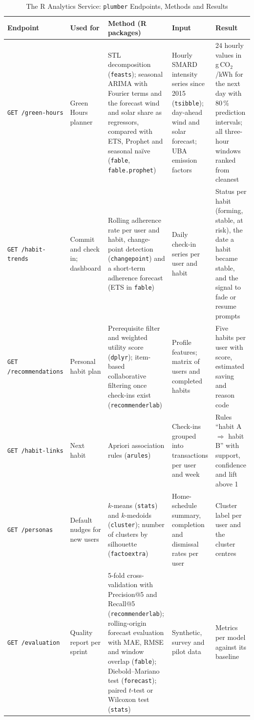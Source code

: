\documentclass[conference]{IEEEtran}
\newcommand{\COtwo}{CO$_2$}
\newcommand{\pkg}[1]{\texttt{#1}}
\begin{document}
\begin{table}[!t]
\caption{The R Analytics Service: \pkg{plumber} Endpoints, Methods and Results}
\label{tab:rapi}
\centering
\footnotesize
\begin{tabular}{@{}L{3.5cm}L{2.1cm}L{4.5cm}L{3.0cm}L{3.5cm}@{}}
\toprule
Endpoint & Used for & Method (R packages) & Input & Result \\
\midrule
\texttt{GET /green-hours} & Green Hours planner & STL decomposition (\pkg{feasts}); seasonal ARIMA with Fourier terms and the forecast wind and solar share as regressors, compared with ETS, Prophet and seasonal na\"ive (\pkg{fable}, \pkg{fable.prophet}) & Hourly SMARD intensity series since 2015 (\pkg{tsibble}); day-ahead wind and solar forecast; UBA emission factors & 24 hourly values in g\,\COtwo/kWh for the next day with 80\,\% prediction intervals; all three-hour windows ranked from cleanest \\
\texttt{GET /habit-trends} & Commit and check in; dashboard & Rolling adherence rate per user and habit, change-point detection (\pkg{changepoint}) and a short-term adherence forecast (ETS in \pkg{fable}) & Daily check-in series per user and habit & Status per habit (forming, stable, at risk), the date a habit became stable, and the signal to fade or resume prompts \\
\texttt{GET /recommendations} & Personal habit plan & Prerequisite filter and weighted utility score (\pkg{dplyr}); item-based collaborative filtering once check-ins exist (\pkg{recommenderlab}) & Profile features; matrix of users and completed habits & Five habits per user with score, estimated saving and reason code \\
\texttt{GET /habit-links} & Next habit & Apriori association rules (\pkg{arules}) & Check-ins grouped into transactions per user and week & Rules ``habit A $\Rightarrow$ habit B'' with support, confidence and lift above 1 \\
\texttt{GET /personas} & Default nudges for new users & $k$-means (\pkg{stats}) and $k$-medoids (\pkg{cluster}); number of clusters by silhouette (\pkg{factoextra}) & Home-schedule summary, completion and dismissal rates per user & Cluster label per user and the cluster centres \\
\texttt{GET /evaluation} & Quality report per sprint & 5-fold cross-validation with Precision@5 and Recall@5 (\pkg{recommenderlab}); rolling-origin forecast evaluation with MAE, RMSE and window overlap (\pkg{fable}); Diebold--Mariano test (\pkg{forecast}); paired $t$-test or Wilcoxon test (\pkg{stats}) & Synthetic, survey and pilot data & Metrics per model against its baseline \\
\bottomrule
\end{tabular}
\end{table}
\end{document}
